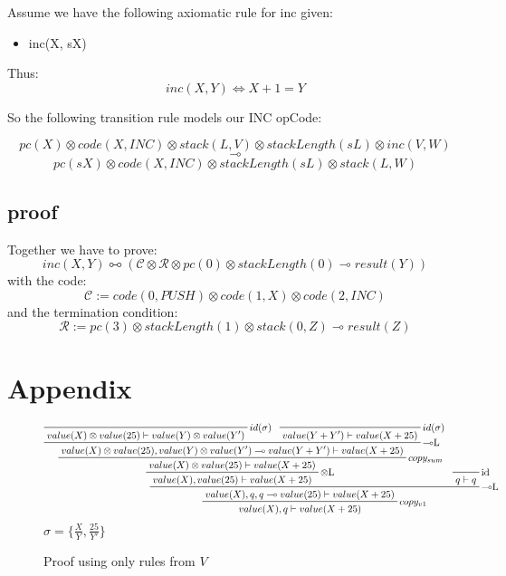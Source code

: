 \documentclass[sigconf]{acmart}
\begin{document}
Assume we have the following axiomatic rule for inc given:

\begin{itemize}
  \item inc(X, sX)
\end{itemize}

Thus:
  $$ inc(X, Y) \Leftrightarrow X + 1 = Y$$


So the following transition rule models our INC opCode:

  $$pc(X) \otimes code(X, INC) \otimes stack(L, V) \otimes stackLength(sL) \otimes inc(V, W)$$
  $$\multimap$$
  $$pc(sX) \otimes code(X, INC) \otimes stackLength(sL) \otimes stack(L, W)$$


\subsection*{proof}

Together we have to prove:
\[ inc(X,Y) \multimapboth (\mathcal{C}\otimes \mathcal{R}\otimes pc(0)\otimes stackLength(0) \multimap result(Y)) \]
with the code:
\[ \mathcal{C} := code(0, PUSH)\otimes code(1, X) \otimes code(2, INC) \]
and the termination condition:
\[ \mathcal{R} := pc(3)\otimes stackLength(1) \otimes stack(0, Z)\multimap result(Z)\]







\section{Appendix}

\begin{figure*}
\[
  \prftree[r] {$\multimap$L}
  {
    \prftree[r] {$\otimes$L}
    {
      \prftree[r] {$copy_{sum}$}
      {
        \prftree[r] {$\multimap$L}
        {
          \prftree[r] {$id(\sigma)$}
          {
            value(X)\otimes value(25)\vdash value(Y)\otimes value(Y')
          }
        }
        {
          \prftree[r] {$id(\sigma)$}
          {
            value(Y + Y')\vdash value(X + 25)
          }
        }
        {
          value(X)\otimes value(25), value(Y)\otimes value(Y')\multimap value(Y + Y')\vdash value(X + 25)
        }
      }
      { value(X)\otimes value(25)\vdash value(X + 25) }
    }
    { value(X),value(25)\vdash value(X + 25) }
  }
  {
    \prftree[r] {id}
    { q\vdash q }
  }
  { \prftree[r] {$copy_{v1}$}
    {value(X),q,q\multimap value(25)\vdash value(X + 25)}
    {value(X),q\vdash value(X + 25)}
  }
\]
$\sigma = \{\frac{X}{Y}, \frac{25}{Y'}\}$
\caption{Proof using only rules from $V$}
\label{pf1}
\end{figure*}
\end{document}
